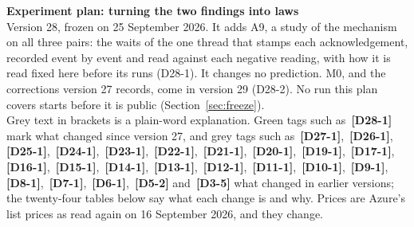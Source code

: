 \documentclass[11pt]{article}
\newcommand{\chg}[1]{\,{\color{chgcol}\bfseries\footnotesize[#1]}}
\newcommand{\chgold}[1]{\,{\color{oldcol}\bfseries\footnotesize[#1]}}
\begin{document}
{\LARGE\bfseries Experiment plan: turning the two findings into laws}\\[3pt]
{\large Version 28, frozen on 25 September 2026. It adds A9, a study of the mechanism on all three pairs: the waits of the one thread that stamps each acknowledgement, recorded event by event and read against each negative reading, with how it is read fixed here before its runs (D28-1). It changes no prediction. M0, and the corrections version 27 records, come in version 29 (D28-2). No run this plan covers starts before it is public (Section~\ref{sec:freeze}).}\\[2pt]
{\color{soft}\small Grey text in brackets is a plain-word explanation. Green tags such as \chg{D28-1} mark what changed since version 27, and grey tags such as \chgold{D27-1}, \chgold{D26-1}, \chgold{D25-1}, \chgold{D24-1}, \chgold{D23-1}, \chgold{D22-1}, \chgold{D21-1}, \chgold{D20-1}, \chgold{D19-1}, \chgold{D17-1}, \chgold{D16-1}, \chgold{D15-1}, \chgold{D14-1}, \chgold{D13-1}, \chgold{D12-1}, \chgold{D11-1}, \chgold{D10-1}, \chgold{D9-1}, \chgold{D8-1}, \chgold{D7-1}, \chgold{D6-1}, \chgold{D5-2} and \chgold{D3-5} what changed in earlier versions; the twenty-four tables below say what each change is and why. Prices are Azure's list prices as read again on 16 September 2026, and they change.}
\end{document}
